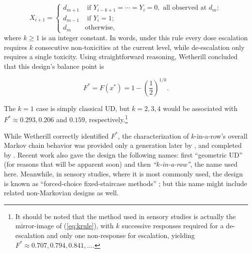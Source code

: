 \begin{equation}\label{eq:krule}
 X_{i+1}=
 \begin{cases}
d_{m+1} &\textrm{ if $Y_{i-k+1}=\cdots=Y_i=0$}, \textrm{ all observed at $d_m$};\\
d_{m-1} &\textrm{ if $Y_i=1$}; \\
d_m &\textrm{otherwise},
 \end{cases}
\end{equation}
\noindent where $k\geq 1$ is an integer constant. In words, under this rule every dose escalation requires $k$ consecutive non-toxicities at the current level, while de-escalation only requires a single toxicity. Using straightforward reasoning, Wetherill concluded that this design's balance point is

\begin{equation}\label{eq:krtarget}
 F^*=F\left(x^*\right)=1-\left(\frac {1}{2}\right)^{1/k}.
\end{equation}

\noindent The $k=1$ case is simply classical UD, but $k=2,3,4$ would be associated with $F^*\approx 0.293,0.206$ and $0.159$, respectively.\footnote{It should be noted that the method used in sensory studies is actually the mirror-image of (\ref{eq:krule}), with $k$ successive responses required for a de-escalation and only one non-response for escalation, yielding $F^*\approx 0.707,0.794,0.841,\ldots$.}

While Wetherill correctly identified $F^*$, the characterization of $k$-in-a-row's overall Markov chain behavior was provided only a generation later by \cite{Gezm:Geom:1996}, and completed by \cite{Oron:Hoff:thek:2009}. Recent work also gave the design the following names: first ``geometric UD'' (for reasons that will be apparent soon) and then \emph{``$k$-in-a-row''}\citep{Ivan:Mont:Moha:Durh:impr:2003}, the name used here. Meanwhile, in sensory studies, where it is most commonly used, the design is known as ``forced-choice fixed-staircase methods'' \citep{Treu:Mini:1995}; but this name might include related non-Markovian designs as well.

